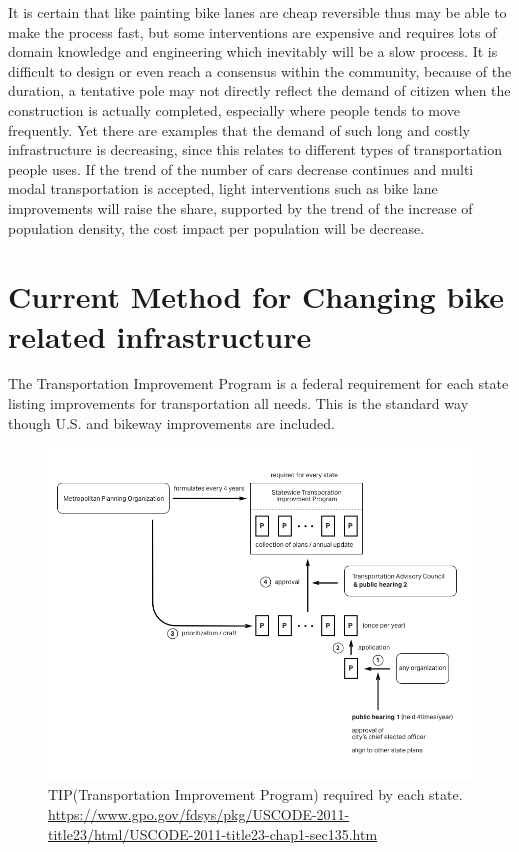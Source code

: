 It is certain that like painting bike lanes are cheap reversible thus may be able to make the process fast, but some interventions are expensive and requires lots of domain knowledge and engineering which inevitably will be a slow process. It is difficult to design or even reach a consensus within the community, because of the duration, a tentative pole may not directly reflect the demand of citizen when the construction is actually completed, especially where people tends to move frequently. Yet there are examples that the demand of such long and costly infrastructure is decreasing, since this relates to different types of transportation people uses. If the trend of the number of cars decrease continues and multi modal transportation is accepted, light interventions such as bike lane improvements will raise the share, supported by the trend of the increase of population density, the cost impact per population will be decrease.

\section{Current Method for Changing bike related infrastructure}

The Transportation Improvement Program is a federal requirement for each state listing improvements for transportation all needs. This is the standard way though U.S. and bikeway improvements are included.

\begin{figure}[!htb]
  \includegraphics{chapters/4/fig/tip_process.png}               
  \caption{TIP(Transportation Improvement Program) required by each state. \url{https://www.gpo.gov/fdsys/pkg/USCODE-2011-title23/html/USCODE-2011-title23-chap1-sec135.htm} 
  }
  \label{fig:tip_process}
\end{figure}

